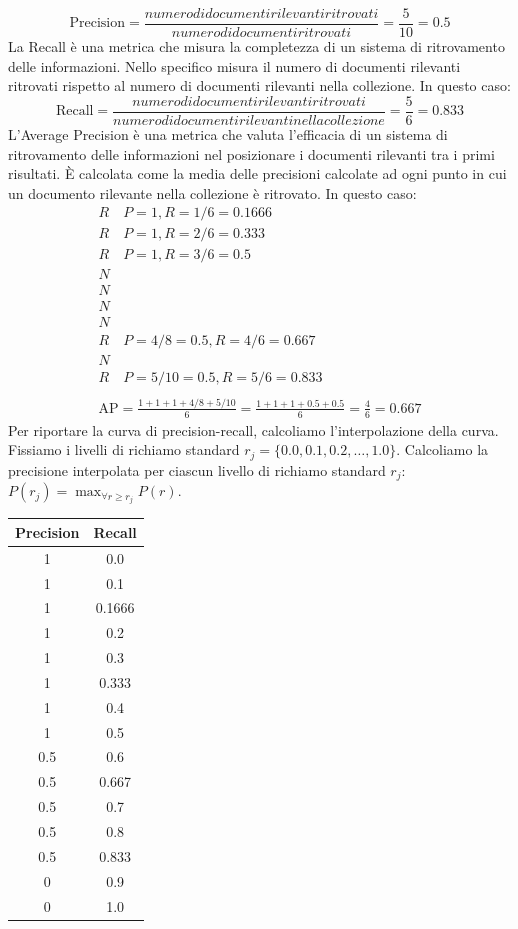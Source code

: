 \documentclass{report}
\begin{document}
	\[
		\text{Precision} = \frac{numero di documenti rilevanti ritrovati}{numero di documenti ritrovati} = \frac{5}{10} = 0.5
	\]
	La Recall è una metrica che misura la completezza di un sistema di ritrovamento delle informazioni. Nello specifico misura il numero di documenti rilevanti ritrovati rispetto al numero di documenti rilevanti nella collezione. In questo caso:
	\[
		\text{Recall} = \frac{numero di documenti rilevanti ritrovati}{numero di documenti rilevanti nella collezione} = \frac{5}{6} = 0.833
	\]
	L'Average Precision è una metrica che valuta l'efficacia di un sistema di ritrovamento delle informazioni nel posizionare i documenti rilevanti tra i primi risultati. È calcolata come la media delle precisioni calcolate ad ogni punto in cui un documento rilevante nella collezione è ritrovato. In questo caso:
	\[
		\begin{array}{l}
		R \quad P=1, R=1/6=0.1666\\
		R \quad P=1, R=2/6=0.333\\
		R \quad P=1, R=3/6=0.5\\
		N\\
		N\\
		N\\
		N\\
		R \quad P=4/8=0.5, R=4/6=0.667\\
		N\\
		R \quad P=5/10=0.5, R=5/6=0.833\\\\
		\text{AP} = \frac{1 + 1 + 1 + 4/8 + 5/10}{6} = \frac{1 + 1 + 1 + 0.5 + 0.5}{6} = \frac{4}{6} = 0.667
		\end{array}
	\]
	Per riportare la curva di precision-recall, calcoliamo l'interpolazione della curva. Fissiamo i livelli di richiamo standard $r_j = \{0.0, 0.1, 0.2, \ldots, 1.0\}$. Calcoliamo la precisione interpolata per ciascun livello di richiamo standard $r_j$: $P(r_j) = \max_{\forall r \geq r_j} P(r)$.
	\begin{table}[H]
		\centering
		\begin{tabular}{|c|c|}
			\hline
			\textbf{Precision} & \textbf{Recall} \\ \hline
			1 & 0.0 \\ \hline
			1 & 0.1 \\ \hline
			1 & 0.1666 \\ \hline
			1 & 0.2 \\ \hline
			1 & 0.3 \\ \hline
			1 & 0.333 \\ \hline
			1 & 0.4 \\ \hline
			1 & 0.5 \\ \hline
			0.5 & 0.6 \\ \hline
			0.5 & 0.667 \\ \hline
			0.5 & 0.7 \\ \hline
			0.5 & 0.8 \\ \hline
			0.5 & 0.833 \\ \hline
			0 & 0.9 \\ \hline
			0 & 1.0 \\ \hline
		\end{tabular}
	\end{table}
\end{document}
